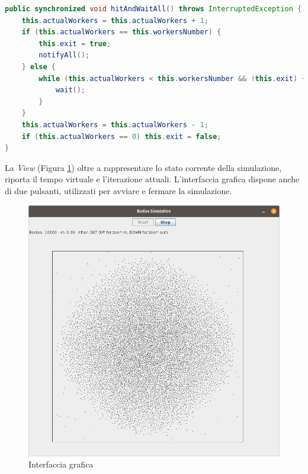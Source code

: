 \documentclass[12pt,a4paper,openright,twoside]{book}
\begin{document}
\begin{lstlisting}[float,
					language=Java,
					label=lst:lst3,caption=Implementazione della barrier]
public synchronized void hitAndWaitAll() throws InterruptedException {
	this.actualWorkers = this.actualWorkers + 1;
	if (this.actualWorkers == this.workersNumber) {
		this.exit = true;
		notifyAll();
	} else {
		while (this.actualWorkers < this.workersNumber && !this.exit) {
			wait();
		}
	}
	this.actualWorkers = this.actualWorkers - 1;
	if (this.actualWorkers == 0) this.exit = false;
}
\end{lstlisting}

La \textit{View} (Figura \ref{fig:gui}) oltre a rappresentare lo stato corrente della simulazione, 
riporta il tempo virtuale e l'iterazione attuali.
L'interfaccia grafica dispone anche di due pulsanti, utilizzati per avviare e fermare la simulazione.

\begin{figure}
	\centering
	\includegraphics[width=\linewidth]{figures/simulation.png}
	\caption{Interfaccia grafica}
	\label{fig:gui}
\end{figure}


\end{document}
